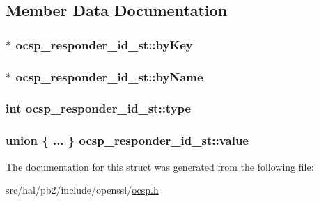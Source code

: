 \subsection{Member Data Documentation}
\subsubsection[{\texorpdfstring{by\+Key}{byKey}}]{$\ast$ ocsp\+\_\+responder\+\_\+id\+\_\+st\+::by\+Key}\hypertarget{structocsp__responder__id__st_adcb31c53f92204c113dadabeec60c6ad}{}\label{structocsp__responder__id__st_adcb31c53f92204c113dadabeec60c6ad}
\subsubsection[{\texorpdfstring{by\+Name}{byName}}]{$\ast$ ocsp\+\_\+responder\+\_\+id\+\_\+st\+::by\+Name}\hypertarget{structocsp__responder__id__st_ae32efd81ddf7eb1dc1f88e1c5f30de60}{}\label{structocsp__responder__id__st_ae32efd81ddf7eb1dc1f88e1c5f30de60}
\subsubsection[{\texorpdfstring{type}{type}}]{\setlength{\rightskip}{0pt plus 5cm}int ocsp\+\_\+responder\+\_\+id\+\_\+st\+::type}\hypertarget{structocsp__responder__id__st_a77bb04f705903d3d2e8c3b5671d6adc6}{}\label{structocsp__responder__id__st_a77bb04f705903d3d2e8c3b5671d6adc6}
\subsubsection[{\texorpdfstring{value}{value}}]{\setlength{\rightskip}{0pt plus 5cm}union \{ ... \}   ocsp\+\_\+responder\+\_\+id\+\_\+st\+::value}\hypertarget{structocsp__responder__id__st_ab32d02c2b49fd8deafd2be676194b6c8}{}\label{structocsp__responder__id__st_ab32d02c2b49fd8deafd2be676194b6c8}


The documentation for this struct was generated from the following file\+:\begin{DoxyCompactItemize}
\item 
src/hal/pb2/include/openssl/\hyperlink{ocsp_8h}{ocsp.\+h}\end{DoxyCompactItemize}
